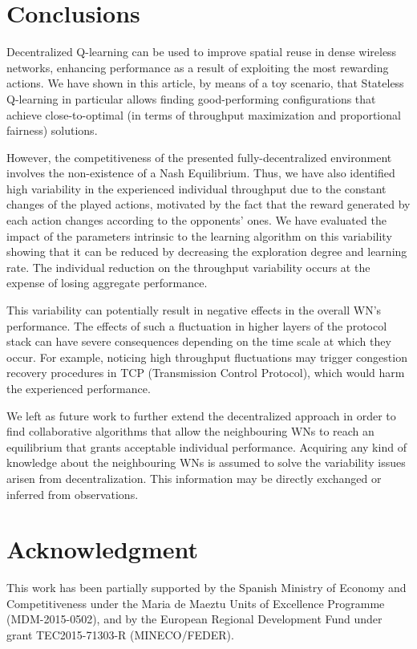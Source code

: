 \documentclass[conference]{IEEEtran}
\begin{document}
	\section{Conclusions }
	\label{section:conclusions}		
	Decentralized Q-learning can be used to improve spatial reuse in dense wireless networks, enhancing performance as a result of exploiting the most rewarding actions. We have shown in this article, by means of a toy scenario, that Stateless Q-learning in particular allows finding good-performing configurations that achieve close-to-optimal (in terms of throughput maximization and proportional fairness) solutions. 
	
	However, the competitiveness of the presented fully-decentralized environment involves the non-existence of a Nash Equilibrium. Thus, we have also identified high variability in the experienced individual throughput due to the constant changes of the played actions, motivated by the fact that the reward generated by each action changes according to the opponents' ones. We have evaluated the impact of the parameters intrinsic to the learning algorithm on this variability showing that it can be reduced by decreasing the exploration degree and learning rate. The individual reduction on the throughput variability occurs at the expense of losing aggregate performance.
	
	This variability can potentially result in negative effects in the overall WN's performance. The effects of such a fluctuation in higher layers of the protocol stack can have severe consequences depending on the time scale at which they occur. For example, noticing high throughput fluctuations may trigger congestion recovery procedures in TCP (Transmission Control Protocol), which would harm the experienced performance. 
	
	We left as future work to further extend the decentralized approach in order to find collaborative algorithms that allow the neighbouring WNs to reach an equilibrium that grants acceptable individual performance. Acquiring any kind of knowledge about the neighbouring WNs is assumed to solve the variability issues arisen from decentralization. This information may be directly exchanged or inferred from observations.
	
	\section*{Acknowledgment}
	This work has been partially supported by the Spanish Ministry of Economy and Competitiveness under the Maria de Maeztu Units of Excellence Programme (MDM-2015-0502), and by the European Regional Development Fund under grant TEC2015-71303-R (MINECO/FEDER). 
	
\end{document}
